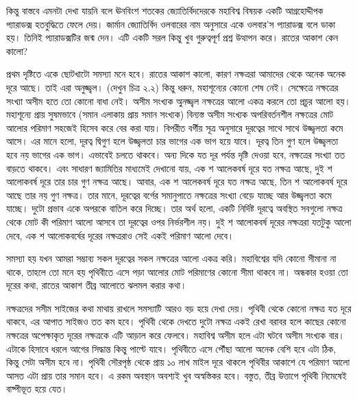 \documentclass[
]{book}
\begin{document}
কিন্তু বাস্তবে এমনটা দেখা যায়নি বলে ঊনবিংশ শতকের জ্যোতির্বিদদেরকে মহাবিশ্ব বিষয়ক একটি আগ্রহোদ্দীপক প্যারাডক্স হতবুদ্ধিতে ফেলে দেয়। জার্মান জ্যোতির্বিদ ওলবারের নাম অনুসারে একে ওলবার'স প্যারাডক্স বলে ডাকা হয়। তিনিই প্যারাডক্সটির জন্ম দেন। এটি একটি সরল কিন্তু খুব গুরুত্বপূর্ণ প্রশ্ন উত্থাপন করে। রাতের আকাশ কেন কালো?

প্রথম দৃষ্টিতে একে ছোটখাটো সমস্যা মনে হবে। রাতের আকাশ কালো, কারণ নক্ষত্ররা আমাদের থেকে অনেক অনেক দূরে আছে। তাই এরা অনুজ্জ্বল। (দেখুন চিত্র ২.২) কিন্তু ধরুন, মহাশূন্যের কোনো শেষ নেই। সেক্ষেত্রে নক্ষত্রের সংখ্যা অসীম হতে তো কোনো বাধা নেই। অসীম সংখ্যক অুনজ্জ্বল নক্ষত্রের আলো একত্র করলে তো প্রচুর আলো হয়। মহাশূন্যে প্রায় সুষমভাবে (সমান এলাকায় প্রায় সমান সংখ্যক) বিন্যস্ত অসীম সংখ্যক অপরিবর্তনশীল নক্ষত্রের মোট আলোর পরিমাণ সহজেই হিসেব করে বের করা যায়। বিপরীত বর্গীয় সূত্র অনুসারে দূরত্বের সাথে সাথে উজ্জ্বলতা কমে আসে। এর মানে হলো, দূরত্ব দ্বিগুণ হলে উজ্জ্বলতা চার ভাগের এক ভাগ হয়ে যাবে। দূরত্ব তিন গুণ হলে উজ্জ্বলতা হবে নয় ভাগের এক ভাগ। এভাবেই চলতে থাকবে। অন্য দিকে যত দূর পর্যন্ত দৃষ্টি দেওয়া হবে, নক্ষত্রের সংখ্যা তত বাড়তে থাকবে। এবং সাধারণ জ্যামিতির মাধ্যমেই দেখানো যায়, এক শ আলেকবর্ষ দূরে যত নক্ষত্র আছে, দুই শ আলোকবর্ষ দূরে তার চার গুণ নক্ষত্র আছে। আবার, এক শ আলেকবর্ষ দূরে যত নক্ষত্র আছে, তিন শ আলোকবর্ষ দূরে আছে তার নয় গুণ নক্ষত্র। তার মানে, দূরত্বের বর্গের সমানুপাতে নক্ষত্রের সংখ্যা বেড়ে যাচ্ছে আর উজ্জ্বলতা কমে যাচ্ছে। দুটো প্রভাব একে অপরকে বাতিল করে দিচ্ছে। তার অর্থ হলো, একটি নির্দিষ্ট দূরত্বে অবস্থিত সবগুলো নক্ষত্র থেকে মোট কী পরিমাণ আলো আসবে তা দূরত্বের ওপর নির্ভরশীল নয়। দুই শ আলোকবর্ষ দূরের নক্ষত্ররা যতটুকু আলো দেবে, এক শ আলোকবর্ষের দূরের নক্ষত্ররাও সেই একই পরিমাণ আলো দেবে।

সমস্যা হয় যখন আমরা সম্ভাব্য সকল দূরত্বের সকল নক্ষত্রের আলো একত্র করি। মহাবিশ্বের যদি কোনো সীমানা না থাকে, তাহলে তো মনে হয় পৃথিবীতে এসে পড়া আলোর মোট পরিমাণের কোনো সীমা থাকবে না। অন্ধকার হওয়া তো দূরের কথা, রাতের আকাশ তীব্র আলোতে ঝলমল করার কথা।

নক্ষত্রদের সসীম সাইজের কথা মাথায় রাখলে সমস্যাটি আরও বড় হয়ে দেখা দেয়। পৃথিবী থেকে কোনো নক্ষত্র যত দূরে থাকবে, এর আপাত সাইজও তত কম হবে। পৃথিবী থেকে দেখতে দুটো নক্ষত্র একই রেখা বরাবর হলে কাছের কোনো নক্ষত্রের অপেক্ষাকৃত দূরের নক্ষত্রকে এটি আড়াল করে ফেলবে। মহাবিশ্ব অসীম হলে এটা ঘটবে অসীম সংখ্যক বার। এটাকে হিসাবে ধরলে আগের সিদ্ধান্ত কিন্তু পাল্টে যাবে। পৃথিবীতে এসে পৌঁছা আলো অনেক বেশি হবে এটা ঠিক, কিন্তু সেটা অসীম হবে না। পৃথিবী সৌরপৃষ্ঠ থেকে প্রায় ১০ লাখ মাইল দূরে থাকলে পৃথিবীর আকাশে যে পরিমাণ আলো আসত এটা প্রায় তার সমান হবে। এ রকম অবস্থান অবশ্যই খুব অস্বস্তিকর হবে। বস্তুত, তীব্র উত্তাপে পৃথিবী নিমেষেই বাষ্পীভূত হয়ে যেত।
\end{document}
